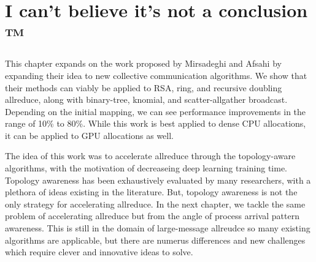 \section{I can't believe it's not a conclusion ™}
This chapter expands on the work proposed by Mirsadeghi and Afsahi \cite{Mirsadeghi2016TopoAwareCollRR} by expanding their idea to new collective communication algorithms.
We show that their methods can viably be applied to RSA, ring, and recursive doubling allreduce, along with binary-tree, knomial, and scatter-allgather broadcast.
Depending on the initial mapping, we can see performance improvements in the range of 10\% to 80\%.
While this work is best applied to dense CPU allocations, it can be applied to GPU allocations as well. 

The idea of this work was to accelerate allreduce through the topology-aware algorithms, with the motivation of decreaseing deep learning training time.
Topology awareness has been exhaustively evaluated by many researchers, with a plethora of ideas existing in the literature.
But, topology awareness is not the only strategy for accelerating allreduce.
In the next chapter, we tackle the same problem of accelerating allreduce but from the angle of process arrival pattern awareness.
This is still in the domain of large-message allreudce so many existing algorithms are applicable, but there are numerus differences and new challenges which require clever and innovative ideas to solve.

